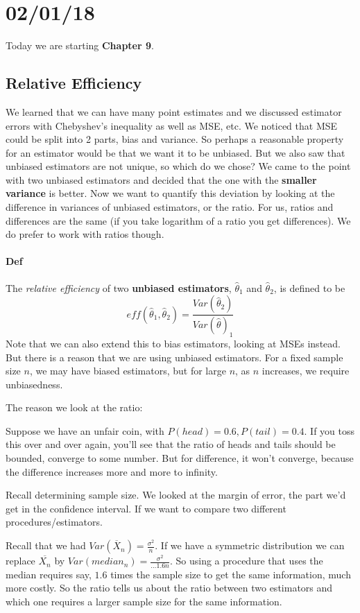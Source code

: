 \documentclass[12 pt]{article}
\begin{document}
  \section{02/01/18}
  Today we are starting \textbf{Chapter 9}.
  \subsection{Relative Efficiency}
  We learned that we can have many point estimates and we discussed
  estimator errors with Chebyshev's inequality as well as MSE, etc. We
  noticed that MSE could be split into 2 parts, bias and variance. So
  perhaps a reasonable property for an estimator would be that we want
  it to be unbiased. But we also saw that unbiased estimators are not
  unique, so which do we chose? We came to the point with two unbiased
  estimators and decided that the one with the \textbf{smaller
    variance} is better. Now we want to quantify this deviation by
  looking at the difference in variances of unbiased estimators, or
  the ratio. For us, ratios and differences are the same (if you take
  logarithm of a ratio you get differences). We do prefer to work with
  ratios though.
  \paragraph{Def} The \textit{relative efficiency} of two \textbf{unbiased
    estimators}, $\hat{\theta}_1$ and $ \hat{\theta}_2$, is defined to
  be
  $$eff(\hat{\theta}_1,\hat{\theta}_2) =
  \frac{Var(\hat{\theta}_2)}{Var(\hat{\theta})_1}$$
  Note that we can also extend this to bias estimators, looking at MSEs
  instead. But there is a reason that we are using unbiased
  estimators. For a fixed sample size $n$, we may have biased
  estimators, but for large $n$, as $n$ increases, we require
  unbiasedness.

  The reason we look at the ratio:

  Suppose we have an unfair coin, with $P(head)=0.6, P(tail)=0.4$. If
  you toss this over and over again, you'll see that the ratio of
  heads and tails should be bounded, converge to some number. But for
  difference, it won't converge, because the difference increases more
  and more to infinity.

  Recall determining sample size. We looked at the margin of error,
  the part we'd get in the confidence interval. If we want to compare
  two different procedures/estimators.

  Recall that we had $Var(\overline{X}_n) = \frac{\sigma^2}{n}$. If we
  have a symmetric distribution we can replace $\overline{X_n}$ by
  $Var(median_n) = \frac{\sigma^2}{\ldots 1.6 n}$. So using a
  procedure that uses the median requires say, $1.6$ times the sample size
  to get the same information, much more costly. So the ratio tells us
  about the ratio between two estimators and which one requires a
  larger sample size for the same information.
\end{document}
